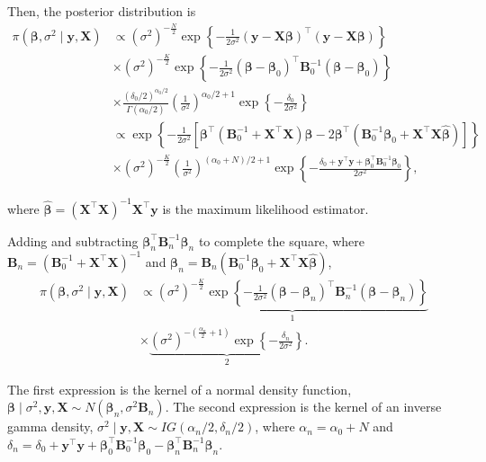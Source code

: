 Then, the posterior distribution is
\begin{align*}
	\pi(\bm{\beta},\sigma^2\mid \bm{y},\bm{X})&\propto (\sigma^2)^{-\frac{N}{2}} \exp \left\{-\frac{1}{2\sigma^2} ({\bm{y}} - {\bm{X}}\bm{\beta})^{\top}({\bm{y}} - {\bm{X}}\bm{\beta}) \right\} \\
	& \times (\sigma^2)^{-\frac{K}{2}} \exp \left\{-\frac{1}{2\sigma^2} (\bm{\beta} - \bm{\beta}_0)^{\top}{\bm{B}}_0^{-1}(\bm{\beta} - \bm{\beta}_0)\right\} \\
	& \times \frac{(\delta_0/2)^{\alpha_0/2}}{\Gamma(\alpha_0/2)}\left(\frac{1}{\sigma^2}\right)^{\alpha_0/2+1}\exp \left\{-\frac{\delta_0}{2\sigma^2} \right\} \\
	& \propto \exp \left\{-\frac{1}{2\sigma^2} [\bm{\beta}^{\top}({\bm{B}}_0^{-1} + {\bm{X}}^{\top}{\bm{X}})\bm{\beta} - 2\bm{\beta}^{\top}({\bm{B}}_0^{-1}\bm{\beta}_0 + {\bm{X}}^{\top}{\bm{X}}\hat{\bm{\beta}})] \right\} \\
	& \times (\sigma^2)^{-\frac{K}{2}} \left(\frac{1}{\sigma^2}\right)^{(\alpha_0+N)/2+1}\exp \left\{-\frac{\delta_0+ {\bm{y}}^{\top}{\bm{y}} + \bm{\beta}_0^{\top}{\bm{B}}_0^{-1}\bm{\beta}_0}{2\sigma^2} \right\},
\end{align*}

where $\hat{\bm{\beta}}=({\bm{X}}^{\top}{\bm{X}})^{-1}{\bm{X}}^{\top}{\bm{y}}$ is the maximum likelihood estimator.

Adding and subtracting $\bm{\beta}_n^{\top}{{\bm{B}}}_n^{-1} \bm{\beta}_n$ to complete the square, where $\bm{B}_n = (\bm{B}_0^{-1} + \bm{X}^{\top}\bm{X})^{-1}$ and $\bm{\beta}_n = \bm{B}_n(\bm{B}_0^{-1}\bm{\beta}_0 + \bm{X}^{\top}\bm{X}\hat{\bm{\beta}})$,
\begin{align*}
	\pi(\bm{\beta},\sigma^2\mid \bm{y},\bm{X})&\propto \underbrace{(\sigma^2)^{-\frac{K}{2}} \exp \left\{-\frac{1}{2\sigma^2} (\bm{\beta}-\bm{\beta}_n)^{\top}{\bm{B}}^{-1}_n(\bm{\beta}-\bm{\beta}_n) \right\}}_1 \\
	& \times \underbrace{(\sigma^2)^{-\left(\frac{\alpha_n}{2}+1 \right)} \exp \left\{-\frac{\delta_n}{2\sigma^2} \right\}}_2.
\end{align*}

The first expression is the kernel of a normal density function, $\bm{\beta}\mid \sigma^2, \bm{y}, \bm{X} \sim N(\bm{\beta}_n, \sigma^2\bm{B}_n)$. The second expression is the kernel of an inverse gamma density,	$\sigma^2\mid  \bm{y}, \bm{X}\sim IG(\alpha_n/2, \delta_n/2)$, where $\alpha_n = \alpha_0 + N$ and $\delta_n = \delta_0 + \bm{y}^{\top}\bm{y} + \bm{\beta}_0^{\top}\bm{B}_0^{-1}\bm{\beta}_0 - \bm{\beta}_n^{\top}\bm{B}_n^{-1}\bm{\beta}_n$.

